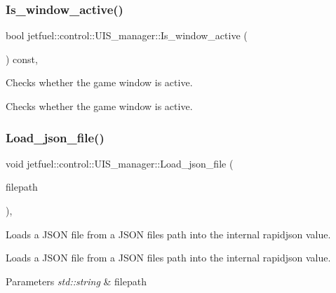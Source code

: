 \subsubsection{\texorpdfstring{Is\+\_\+window\+\_\+active()}{Is\_window\_active()}}
{\footnotesize\ttfamily bool jetfuel\+::control\+::\+U\+I\+S\+\_\+manager\+::\+Is\+\_\+window\+\_\+active (\begin{DoxyParamCaption}{ }\end{DoxyParamCaption}) const\hspace{0.3cm}{\ttfamily [inline]}, {\ttfamily [protected]}}



Checks whether the game window is active. 

Checks whether the game window is active. \mbox{\label{classjetfuel_1_1control_1_1UIS__manager_ac24dcfc57f2b9464571ce15b40fafa2c}} 
\subsubsection{\texorpdfstring{Load\+\_\+json\+\_\+file()}{Load\_json\_file()}}
{\footnotesize\ttfamily void jetfuel\+::control\+::\+U\+I\+S\+\_\+manager\+::\+Load\+\_\+json\+\_\+file (\begin{DoxyParamCaption}\item[{const std\+::string}]{filepath }\end{DoxyParamCaption})\hspace{0.3cm}{\ttfamily [inline]}, {\ttfamily [protected]}}



Loads a J\+S\+ON file from a J\+S\+ON file\textquotesingle{}s path into the internal rapidjson value. 

Loads a J\+S\+ON file from a J\+S\+ON file\textquotesingle{}s path into the internal rapidjson value.


\begin{DoxyParams}{Parameters}
{\em std\+::string} & filepath \\
\hline
\end{DoxyParams}
\mbox{\label{classjetfuel_1_1control_1_1UIS__manager_a8a15d34ba4ae580ef4d39250695a16e3}} 
